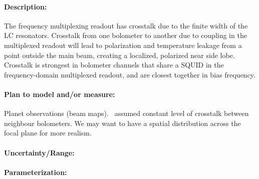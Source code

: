 \paragraph{Description:}
The frequency multiplexing readout has crosstalk due to the finite width of the LC resonators.
Crosstalk from one bolometer to another due to coupling in the multiplexed readout will lead to polarization and temperature leakage from a point outside the main beam, creating a localized, polarized near side lobe. Crosstalk is strongest in bolometer channels that share a SQUID in the frequency-domain multiplexed readout, and are closest together in bias frequency.

\paragraph{Plan to model and/or measure:}
Planet observations (beam maps). \pb\ assumed constant level of crosstalk between neighbour bolometers. We may want to have a spatial distribution across the focal plane for more realism.

\paragraph{Uncertainty/Range:}

\paragraph{Parameterization:}